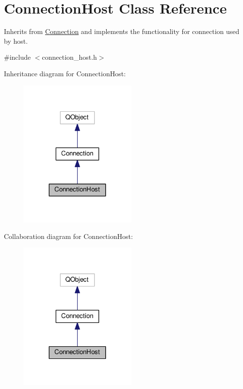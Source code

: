 \hypertarget{classMODEL_1_1ConnectionHost}{}\section{Connection\+Host Class Reference}
\label{classMODEL_1_1ConnectionHost}


Inherits from \hyperlink{classMODEL_1_1Connection}{Connection} and implements the functionality for connection used by host.  




{\ttfamily \#include $<$connection\+\_\+host.\+h$>$}



Inheritance diagram for Connection\+Host\+:\nopagebreak
\begin{figure}[H]
\begin{center}
\leavevmode
\includegraphics[width=167pt]{classMODEL_1_1ConnectionHost__inherit__graph}
\end{center}
\end{figure}


Collaboration diagram for Connection\+Host\+:\nopagebreak
\begin{figure}[H]
\begin{center}
\leavevmode
\includegraphics[width=167pt]{classMODEL_1_1ConnectionHost__coll__graph}
\end{center}
\end{figure}
